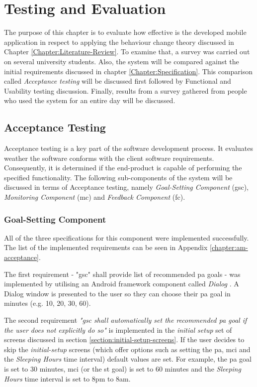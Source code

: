 \chapter{Testing and Evaluation}
\label{chapter:testing-and-eval}
The purpose of this chapter is to evaluate how effective is the developed mobile application in respect to applying the behaviour change theory discussed in Chapter \ref{Chapter:Literature-Review}. To examine that, a survey was carried out on several university students. Also, the system will be compared against the initial requirements discussed in chapter \ref{Chapter:Specification}. This comparison called \textit{Acceptance testing} will be discussed first followed by Functional and Usability testing discussion. Finally, results from a survey gathered from people who used the system for an entire day will be discussed.



\section{Acceptance Testing}
Acceptance testing is a key part of the software development process. It evaluates weather the software conforms with the client software requirements. Consequently, it is determined if the end-product is capable of performing the specified functionality. The following sub-components of the system will be discussed in terms of Acceptance testing, namely \textit{Goal-Setting Component} (\gls{gsc}), \textit{Monitoring Component} (\gls{mc}) and \textit{Feedback Component} (\gls{fc}).

\subsection{Goal-Setting Component}
All of the three specifications for this component were implemented successfully. The list of the implemented requirements can be seen in Appendix \ref{chapter:am-acceptance}.

The first requirement - "\gls{gsc}" shall provide list of recommended \gls{pa} goals - was implemented by utilising an Android framework component called \textit{Dialog} \citep{androiddialogs_2017}. A Dialog window is presented to the user so they can choose their \gls{pa} goal in minutes (e.g. 10, 20, 30, 60).

The second requirement \textit{"\gls{gsc} shall automatically set the recommended \gls{pa} goal if the user does not explicitly do so"} is implemented in the \textit{initial setup} set of screens discussed in section \ref{section:initial-setup-screens}. If the user decides to skip the \textit{initial-setup} screens (which offer options such as setting the \gls{pa}, \gls{mci} and the \textit{Sleeping Hours} time interval) default values are set. For example, the \gls{pa} goal is set to 30 minutes, \gls{mci} (or the \gls{st} goal) is set to 60 minutes and the \textit{Sleeping Hours} time interval is set to 8pm to 8am.

